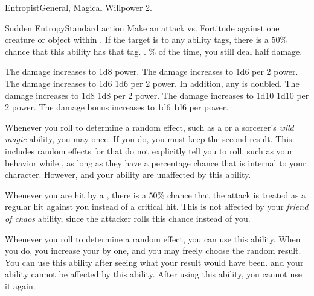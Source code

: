   \begin{magicalfeat}{Entropist}{General, Magical}
    \featpre Willpower 2.

    \begin{magicalactiveability}{Sudden Entropy}{Standard action}
      \rankline
      Make an attack vs. Fortitude against one creature or object within \shortrange.
      If the target is \vulnerable to any ability tags, there is a 50\% chance that this ability has that tag.
      \hit \damageranktwo.
      \% of the time, you still deal half damage.

      \rankline
       The damage increases to 1d8 \add power.
       The damage increases to 1d6 per 2 power.
       The damage increases to 1d6 \add 1d6 per 2 power.
        In addition, any  is doubled.
       The damage increases to 1d8 \add 1d8 per 2 power.
       The damage increases to 1d10 \add 1d10 per 2 power.
       The damage bonus increases to 1d6 \add 1d6 per power.
    \end{magicalactiveability}

     Whenever you roll to determine a random effect, such as a  or a sorcerer's \textit{wild magic} ability, you may  once.
    If you do, you must keep the second result.
    This includes random effects for that do not explicitly tell you to roll, such as your behavior while \confused, as long as they have a percentage chance that is internal to your character.
    However,  and your  ability are unaffected by this ability.

     Whenever you are hit by a , there is a 50\% chance that the attack is treated as a regular hit against you instead of a critical hit.
    This is not affected by your \textit{friend of chaos} ability, since the attacker rolls this chance instead of you.

     Whenever you roll to determine a random effect, you can use this ability.
    When you do, you increase your  by one, and you may freely choose the random result.
    You can use this ability after seeing what your result would have been.
     and your  ability cannot be affected by this ability.
    After using this ability, you  cannot use it again.
  \end{magicalfeat}

